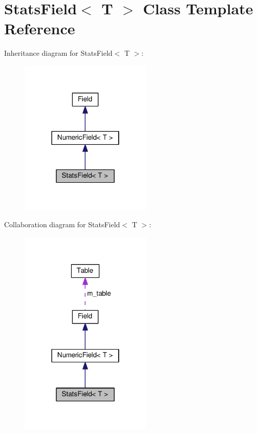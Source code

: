 \hypertarget{classStatsField}{}\section{Stats\+Field$<$ T $>$ Class Template Reference}
\label{classStatsField}


Inheritance diagram for Stats\+Field$<$ T $>$\+:\nopagebreak
\begin{figure}[H]
\begin{center}
\leavevmode
\includegraphics[width=178pt]{classStatsField__inherit__graph}
\end{center}
\end{figure}


Collaboration diagram for Stats\+Field$<$ T $>$\+:\nopagebreak
\begin{figure}[H]
\begin{center}
\leavevmode
\includegraphics[width=178pt]{classStatsField__coll__graph}
\end{center}
\end{figure}
